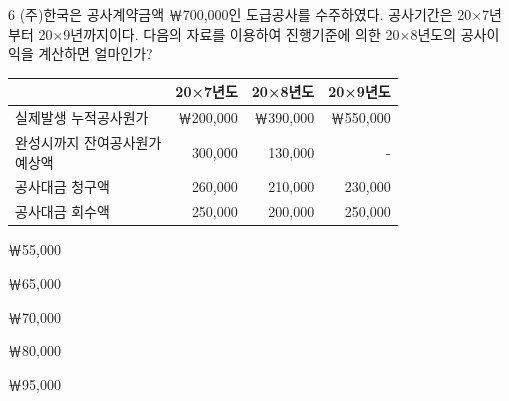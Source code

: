 \begin{question}{6}
(주)한국은 공사계약금액 ￦700,000인 도급공사를 수주하였다. 공사기간은 20×7년부터 20×9년까지이다. 다음의 자료를 이용하여 진행기준에 의한 20×8년도의 공사이익을 계산하면 얼마인가?

{\small\centering
\begin{tabular}{|l|r|r|r|}
\hline
 & \multicolumn{1}{c|}{20×7년도} & \multicolumn{1}{c|}{20×8년도} & \multicolumn{1}{c|}{20×9년도} \\
\hline
실제발생 누적공사원가 & ￦200,000 & ￦390,000 & ￦550,000 \\
\hline
\makecell[l]{완성시까지 잔여공사원가\\예상액} & 300,000 & 130,000 & - \\
\hline
공사대금 청구액 & 260,000 & 210,000 & 230,000 \\
\hline
공사대금 회수액 & 250,000 & 200,000 & 250,000 \\
\hline
\end{tabular}\par}

\begin{choices}
  \item ￦55,000
  \item ￦65,000
  \item ￦70,000
  \item ￦80,000
  \item ￦95,000
\end{choices}
\end{question}
